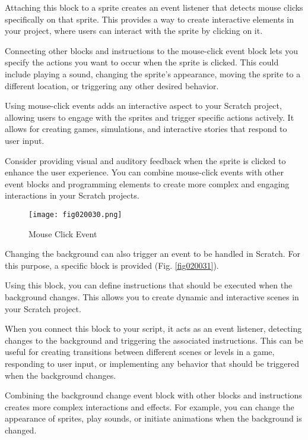 Attaching this block to a sprite creates an event listener that detects mouse clicks specifically on that sprite. This provides a way to create interactive elements in your project, where users can interact with the sprite by clicking on it.

Connecting other blocks and instructions to the mouse-click event block lets you specify the actions you want to occur when the sprite is clicked. This could include playing a sound, changing the sprite's appearance, moving the sprite to a different location, or triggering any other desired behavior.

Using mouse-click events adds an interactive aspect to your Scratch project, allowing users to engage with the sprites and trigger specific actions actively. It allows for creating games, simulations, and interactive stories that respond to user input.

Consider providing visual and auditory feedback when the sprite is clicked to enhance the user experience. You can combine mouse-click events with other event blocks and programming elements to create more complex and engaging interactions in your Scratch projects.

\begin{figure}[H]
   \centering
   \texttt{[image: fig020030.png]}
   \caption{Mouse Click Event}
\label{fig020030}
\end{figure}

Changing the background can also trigger an event to be handled in Scratch. For this purpose, a specific block is provided (Fig. \ref{fig020031}). 

Using this block, you can define instructions that should be executed when the background changes. This allows you to create dynamic and interactive scenes in your Scratch project.

When you connect this block to your script, it acts as an event listener, detecting changes to the background and triggering the associated instructions. This can be useful for creating transitions between different scenes or levels in a game, responding to user input, or implementing any behavior that should be triggered when the background changes.

Combining the background change event block with other blocks and instructions creates more complex interactions and effects. For example, you can change the appearance of sprites, play sounds, or initiate animations when the background is changed.

